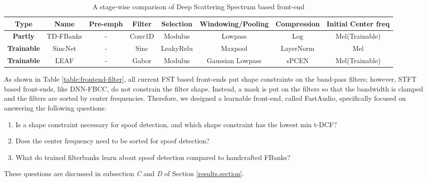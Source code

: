 \documentclass[conference]{IEEEtran}
\begin{document}
\begin{table*}[htb!]
\caption{\label{table:DSPfrontend}A stage-wise comparison of Deep Scattering Spectrum based front-end}
\begin{center}
\begin{tabular}{|c|c|c|c|c|c|c|c|}
\hline
\textbf {Type} & \textbf{Name} & \textbf{Pre-emph} & \textbf{Filter} & \textbf{Selection} & \textbf{Windowing/Pooling} & \textbf{Compression}  & \textbf{Initial Center freq}\\
\hline
\textbf {Partly} & TD-FBanks & - & Conv1D & Modulus & Lowpass& Log & Mel(Trainable)\\
\cline{2-8} 
\textbf {Trainable} & SincNet & - & Sinc & LeakyRelu& Maxpool & LayerNorm & Mel\\
\hline
\textbf {Trainable} & LEAF & - & Gabor & Modulus & Gaussian Lowpass & sPCEN & Mel(Trainable)\\
\cline{2-8} 

\hline
\end{tabular}
\label{tab1}
\end{center}
\end{table*}

As shown in Table \ref{table:frontend-filter}, all current FST based front-ends put shape constraints on the band-pass filters; however, STFT based front-ends, like DNN-FBCC, do not constrain the filter shape. Instead, a mask is put on the filters so that the bandwidth is clamped and the filters are sorted by center frequencies. Therefore, we designed a learnable front-end, called FastAudio, specifically focused on answering the following questions: 

\begin{enumerate}
    \item Is a shape constraint necessary for spoof detection, and which shape constraint has the lowest min t-DCF? 
    \item Does the center frequency need to be sorted for spoof detection? 
    \item What do trained filterbanks learn about spoof detection compared to handcrafted FBanks?
\end{enumerate}
These questions are discussed in subsection \textit{C} and \textit{D} of Section \ref{results.section}.
\end{document}

